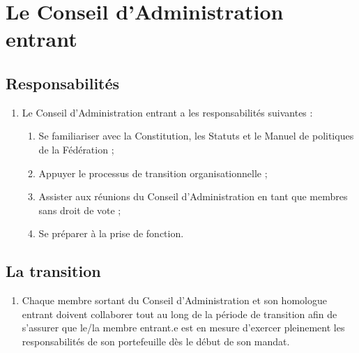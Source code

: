 \section{Le Conseil d'Administration entrant}
\label{le-conseil-dadministration-entrant}

\subsection{Responsabilités}
\label{responsabilites-conseil-entrant}

\begin{enumerate}
 \item
  Le Conseil d'Administration entrant a les responsabilités suivantes :
  \begin{enumerate}
   \item
    Se familiariser avec la Constitution, les Statuts et le Manuel de politiques de la Fédération ;
   \item
    Appuyer le processus de transition organisationnelle ;
   \item
    Assister aux réunions du Conseil d'Administration en tant que membres sans droit de vote ;
   \item
    Se préparer à la prise de fonction.
  \end{enumerate}
\end{enumerate}

\subsection{La transition}
\label{la-transition-conseil-entrant}

\begin{enumerate}
 \item
  Chaque membre sortant du Conseil d'Administration et son homologue entrant doivent collaborer tout au long de la période de transition afin de s'assurer que le/la membre entrant.e est en mesure d'exercer pleinement les responsabilités de son portefeuille dès le début de son mandat.
\end{enumerate}
